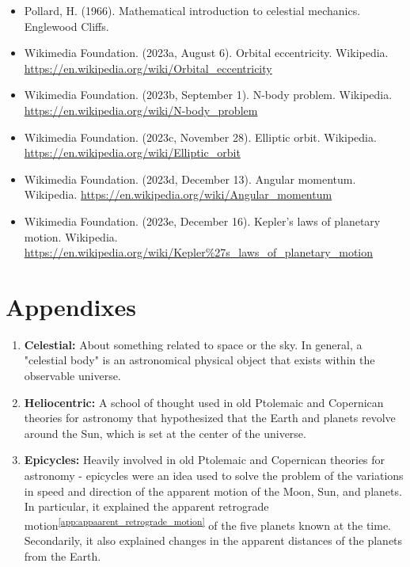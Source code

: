 \documentclass[12pt]{article}
\newcommand{\sref}[1]{\textsuperscript{\ref{#1}}}
\begin{document}
\begin{spacing}{1.25}
{\begin{itemize}
        \item Pollard, H. (1966). Mathematical introduction to celestial mechanics. 
        Englewood Cliffs. 
        
        \item Wikimedia Foundation. (2023a, August 6). Orbital eccentricity.
        Wikipedia. \url{https://en.wikipedia.org/wiki/Orbital\_eccentricity} 
        
        \item Wikimedia Foundation. (2023b, September 1). N-body problem.
        Wikipedia. \url{https://en.wikipedia.org/wiki/N-body\_problem}
        
        \item Wikimedia Foundation. (2023c, November 28). Elliptic orbit. 
        Wikipedia. \url{https://en.wikipedia.org/wiki/Elliptic\_orbit}
        
        \item Wikimedia Foundation. (2023d, December 13). Angular momentum. 
        Wikipedia. \url{https://en.wikipedia.org/wiki/Angular\_momentum}
        
        \item Wikimedia Foundation. (2023e, December 16). Kepler’s laws of planetary motion. 
        Wikipedia. \url{https://en.wikipedia.org/wiki/Kepler\%27s\_laws\_of\_planetary\_motion}
    \end{itemize}
}
 

\newpage
\section{Appendixes}
\par {
    \begin{enumerate}                
        \item \label{app:celestial} \textbf{Celestial:} About something related to space or the sky. In general, a "celestial body" is an astronomical physical object that exists within the observable universe. 

        \item \label{app:heliocentric} \textbf{Heliocentric:} A school of thought used in old Ptolemaic and Copernican theories for astronomy that hypothesized that the Earth and planets revolve around the Sun, which is set at the center of the universe.

        \item \label{app:epicycles}\textbf{Epicycles:} Heavily involved in old Ptolemaic and Copernican theories for astronomy - epicycles were an idea used to solve the problem of the variations in speed and direction of the apparent motion of the Moon, Sun, and planets. In particular, it explained the apparent retrograde motion\sref{app:appaarent_retrograde_motion} of the five planets known at the time. Secondarily, it also explained changes in the apparent distances of the planets from the Earth.


\end{enumerate}}
\end{spacing}
\end{document}
